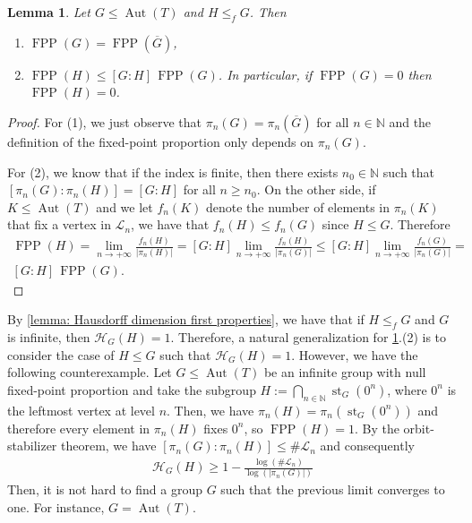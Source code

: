 \documentclass{amsart}
\def\abs#1{\left\vert{#1}\right\vert}
\def\NN{\mathbb N}
\DeclareMathOperator{\Aut}{Aut}
\DeclareMathOperator{\FPP}{FPP}
\DeclareMathOperator{\st}{st}
\newtheorem{Lemma}[Proposition]{Lemma}
\begin{document}
\begin{Lemma}
Let $G \leq \Aut(T)$ and $H \leq_f G$. Then
\begin{enumerate}
    \item $\FPP(G) = \FPP(\overline{G})$,
    \item $\FPP(H) \leq [G:H] \, \FPP(G)$. In particular, if $\FPP(G) = 0$ then $\FPP(H) = 0$.
\end{enumerate}
\label{lemma: FPP first properties}
\end{Lemma}

\begin{proof}
For (1), we just observe that $\pi_n(G) = \pi_n(\overline{G})$ for all $n \in \NN$ and the definition of the fixed-point proportion only depends on $\pi_n(G)$. 

For (2), we know that if the index is finite, then there exists $n_0 \in \NN$ such that $[\pi_n(G): \pi_n(H)] = [G:H]$ for all $n \geq n_0$. On the other side, if $K \leq \Aut(T)$ and we let $f_n(K)$ denote the number of elements in $\pi_n(K)$ that fix a vertex in $\mathcal{L}_n$, we have that $f_n(H) \leq f_n(G)$ since $H \leq G$. Therefore 
\begin{align*}
\FPP(H) = \lim_{n \rightarrow +\infty} \frac{f_n(H)}{\abs{\pi_n(H)}} = [G:H] \lim_{n \rightarrow +\infty} \frac{f_n(H)}{\abs{\pi_n(G)}} \leq [G:H] \lim_{n \rightarrow +\infty} \frac{f_n(G)}{\abs{\pi_n(G)}} = \\ [G:H] \,  \FPP(G).
\end{align*}
\end{proof}

By \cref{lemma: Hausdorff dimension first properties}, we have that if $H \leq_f G$ and $G$ is infinite, then $\mathcal{H}_G(H) = 1$. Therefore, a natural generalization for \cref{lemma: FPP first properties}.(2) is to consider the case of $H \leq G$ such that $\mathcal{H}_G(H) = 1$. However, we have the following counterexample. Let $G \leq \Aut(T)$ be an infinite group with null fixed-point proportion and take the subgroup $H := \bigcap_{n \in \NN} \st_G(0^n)$, where $0^n$ is the leftmost vertex at level $n$. Then, we have $\pi_n(H) = \pi_n(\st_G(0^n))$ and therefore every element in $\pi_n(H)$ fixes $0^n$, so $\FPP(H) = 1$. By the orbit-stabilizer theorem, we have $[\pi_n(G): \pi_n(H)] \leq \# \mathcal{L}_n$ and consequently 
\begin{align*}
\mathcal{H}_G(H) \geq 1 - \frac{\log(\# \mathcal{L}_n)}{\log(\abs{\pi_n(G)})}
\end{align*}
Then, it is not hard to find a group $G$ such that the previous limit converges to one. For instance, $G = \Aut(T)$. 
\end{document}
